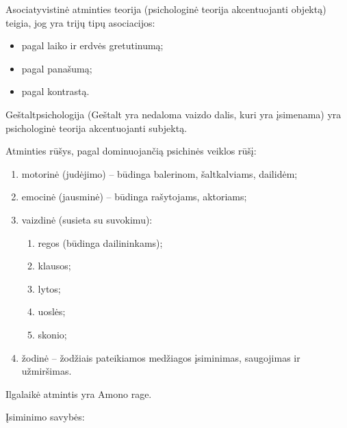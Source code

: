 
Asociatyvistinė atminties teorija (psichologinė teorija akcentuojanti
objektą) teigia, jog yra trijų tipų asociacijos:

\begin{itemize}
  \item pagal laiko ir erdvės gretutinumą;
  \item pagal panašumą;
  \item pagal kontrastą.
\end{itemize}

Geštaltpsichologija (Geštalt yra nedaloma vaizdo dalis, kuri yra įsimenama)
yra psichologinė teorija akcentuojanti subjektą.

Atminties rūšys, pagal dominuojančią psichinės veiklos rūšį:

\begin{enumerate}
  \item motorinė (judėjimo) – būdinga balerinom, šaltkalviams, dailidėm;
  \item emocinė (jausminė) – būdinga rašytojams, aktoriams;
  \item vaizdinė (susieta su suvokimu):
    \begin{enumerate}
      \item regos (būdinga dailininkams);
      \item klausos;
      \item lytos;
      \item uoslės;
      \item skonio;
    \end{enumerate}
  \item žodinė – žodžiais pateikiamos medžiagos įsiminimas, saugojimas ir
    užmiršimas.
\end{enumerate}

Ilgalaikė atmintis yra Amono rage.

\label{tema:atminties_procesai}

Įsiminimo savybės:


